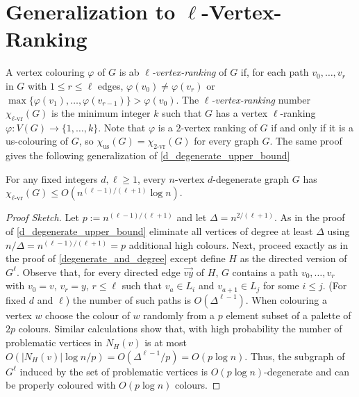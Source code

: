 \documentclass{patmorin}
\newcommand{\defin}[1]{\emph{\color{brightmaroon}#1}}
\newcommand{\rn}[1]{\chi_{\operatorname{#1-vr}}}
\newcommand{\trn}{\chi_{\mathrm{us}}}
\newcommand{\lrn}{\rn{\ell}}
\begin{document}
\section{Generalization to $\ell$-Vertex-Ranking}

A vertex colouring $\varphi$ of $G$ is ab \defin{$\ell$-vertex-ranking} of $G$ if, for each path $v_0,\ldots,v_r$ in $G$ with $1\le r\le\ell$ edges, $\varphi(v_0)\neq \varphi(v_r)$ or $\max\{\varphi(v_1),\ldots,\varphi(v_{r-1})\}>\varphi(v_0)$.  The \defin{$\ell$-vertex-ranking} number $\lrn(G)$ is the minimum integer $k$ such that $G$ has a vertex $\ell$-ranking $\varphi:V(G)\to\{1,\ldots,k\}$.  Note that $\varphi$ is a $2$-vertex ranking of $G$ if and only if it is a us-colouring of $G$, so $\trn(G)=\rn{2}(G)$ for every graph $G$.  The same proof gives the following generalization of \cref{d_degenerate_upper_bound}

\begin{thm}
  For any fixed integers $d,\ell\ge 1$, every $n$-vertex $d$-degenerate graph $G$ has $\lrn(G) \le O(n^{(\ell-1)/(\ell+1)}\log  n)$.
\end{thm}

\begin{proof}[Proof Sketch]
  Let $p:=n^{(\ell-1)/(\ell+1)}$ and let $\Delta=n^{2/(\ell+1)}$.  As in the proof of \cref{d_degenerate_upper_bound} eliminate all vertices of degree at least $\Delta$ using $n/\Delta = n^{(\ell-1)/(\ell+1)}=p$ additional high colours.  Next, proceed exactly as in the proof of \cref{degenerate_and_degree} except define $H$ as the directed version of $G^{\ell}$.  Observe that, for every directed edge $\overrightarrow{vy}$ of $H$, $G$ contains a path $v_0,\ldots,v_r$ with $v_0=v$, $v_r=y$, $r\le \ell$ such that $v_a\in L_i$ and $v_{a+1}\in L_j$ for some $i\le j$.  (For fixed $d$ and $\ell$) the number of such paths is $O(\Delta^{\ell-1})$. When colouring a vertex $w$ choose the colour of $w$ randomly from a $p$ element subset of a palette of $2p$ colours.  Similar calculations show that, with high probability the number of problematic vertices in $N_{H}(v)$ is at most $O(|N_{H}(v)|\log n/p)=O(\Delta^{\ell-1}/p)=O(p\log n)$.  Thus, the subgraph of $G^\ell$ induced by the set of problematic vertices is $O(p\log n)$-degenerate and can be properly coloured with $O(p\log n)$ colours.
\end{proof}

\end{document}
